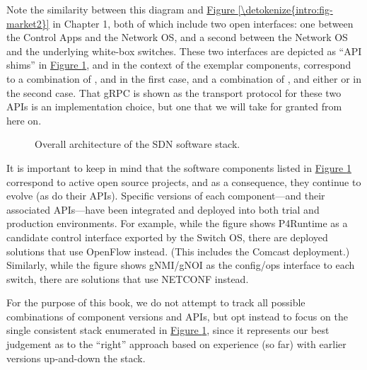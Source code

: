 \documentclass[letterpaper,11pt,english]{sphinxmanual}
\let\sphinxpxdimen\pdfpxdimen\else\newdimen\sphinxpxdimen
\begin{document}
Note the similarity between this diagram and \hyperref[\detokenize{intro:fig-market2}]{Figure \ref{\detokenize{intro:fig-market2}}} in Chapter 1, both of which include two open
interfaces: one between the Control Apps and the Network OS, and a
second between the Network OS and the underlying white-box
switches. These two interfaces are depicted as “API shims” in
\hyperref[\detokenize{arch:fig-stack}]{Figure \ref{\detokenize{arch:fig-stack}}}, and in the context of the exemplar
components, correspond to a combination of ,  and
 in the first case, and a combination of , 
and either  or  in the second case. That gRPC is
shown as the transport protocol for these two APIs is an
implementation choice, but one that we will take for granted from here
on.

\begin{figure}[htbp]
\centering
\capstart

\noindent\sphinxincludegraphics[width=550\sphinxpxdimen]{{Slide8}.png}
\caption{Overall architecture of the SDN software stack.}\label{\detokenize{arch:id5}}\label{\detokenize{arch:fig-stack}}\end{figure}

It is important to keep in mind that the software components listed in
\hyperref[\detokenize{arch:fig-stack}]{Figure \ref{\detokenize{arch:fig-stack}}} correspond to active open source
projects, and as a consequence, they continue to evolve (as do their
APIs). Specific versions of each component—and their associated
APIs—have been integrated and deployed into both trial and production
environments. For example, while the figure shows P4Runtime as a
candidate control interface exported by the Switch OS, there are
deployed solutions that use OpenFlow instead. (This includes the
Comcast deployment.) Similarly, while the figure shows gNMI/gNOI as
the config/ops interface to each switch, there are solutions that use
NETCONF instead.

For the purpose of this book, we do not attempt to track all possible
combinations of component versions and APIs, but opt instead to focus
on the single consistent stack enumerated in \hyperref[\detokenize{arch:fig-stack}]{Figure \ref{\detokenize{arch:fig-stack}}}, since it represents our best judgement as to the “right”
approach based on experience (so far) with earlier versions up-and-down
the stack.
\end{document}
